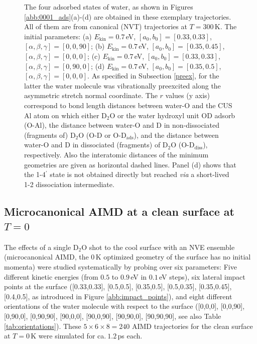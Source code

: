 \documentclass[11pt,DIV=13,BCOR=5mm,a4paper,headinclude]{scrbook}
\begin{document}
\begin{figure}[h!]
\caption{The four adsorbed states of water, as shown in Figures \ref{abb:0001_ads}(a)-(d) are obtained in these exemplary trajectories.
All of them are from canonical (NVT) trajectories at  $T=300\,$K.
The initial parameters: (a) $E_\textrm{kin}=0.7\,$eV, $[a_0,b_0]=[0.33,0.33]$, $[\alpha,\beta,\gamma]=[0,0,90]$;
 (b) $E_\textrm{kin}=0.7\,$eV, $[a_0,b_0]=[0.35,0.45]$, $[\alpha,\beta,\gamma]=[0,0,0]$;
 (c) $E_\textrm{kin}=0.7\,$eV, $[a_0,b_0]=[0.33,0.33]$, $[\alpha,\beta,\gamma]=[0,90,0]$;
 (d) $E_\textrm{kin}=0.7\,$eV, $[a_0,b_0]=[0.35,0.5]$, $[\alpha,\beta,\gamma]=[0,0,0]$.
As specified in Subsection \ref{preex}, for the latter the water molecule was vibrationally preexcited along the asymmetric stretch normal coordinate.
The $r$ values (y axis) correspond to bond length distances between water-O and the CUS Al atom on which either D$_2$O or the water hydroxyl unit OD adsorb (O-Al), the distance between water-O and D in non-dissociated (fragments of) D$_2$O (O-D or O-D$_\textrm{ads}$), and the  distance between water-O and D in dissociated (fragments) of D$_2$O (O-D$_\textrm{diss}$), respectively.
Also the interatomic distances of the minimum geometries are given as horizontal dashed lines.
Panel (d) shows that the 1-4$^\prime$ state is not obtained directly but reached \textit{via} a short-lived 1-2 dissociation intermediate.}
\label{abb:ex_traj}
\end{figure}


\subsection{Microcanonical AIMD at a clean surface at $T=0$}\label{sec:mic_clean}
The effects of a single D$_2$O shot to the cool surface with an NVE ensemble (microcanonical AIMD, the $0\,$K optimized geometry of the surface has no initial momenta) were studied systematically by probing over six parameters: Five different kinetic energies (from $0.5$ to $0.9\,$eV in $0.1\,$eV steps), six lateral impact points at the surface ([0.33,0.33], [0.5,0.5], [0.35,0.5], [0.5,0.35], [0.35,0.45], [0.4,0.5], as introduced in Figure \ref{abb:impact_points}), and eight different orientations of the water molecule with respect to the surface ([0,0,0], [0,0,90], [0,90,0], [0,90,90], [90,0,0], [90,0,90], [90,90,0], [90,90,90], see also Table \ref{tab:orientations}).
These $5\times 6\times 8=240$ AIMD trajectories for the clean surface at $T=0\,$K were simulated for ca.$~1.2\,$ps each.
\end{document}
